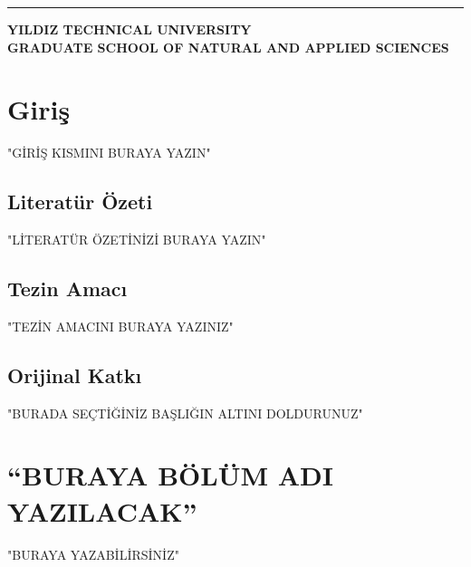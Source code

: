 \documentclass[12pt]{report}
\begin{document}
\vspace{1ex}
\hrule
\begin{flushright}
\textbf{YILDIZ TECHNICAL UNIVERSITY \\ GRADUATE SCHOOL OF NATURAL AND APPLIED SCIENCES}
\end{flushright}



{}

\chapter{Giriş} %
"GİRİŞ KISMINI BURAYA YAZIN"

\section{Literatür Özeti} %
\label{sec: literatur ozeti}
"LİTERATÜR ÖZETİNİZİ BURAYA YAZIN"

\section{Tezin Amacı} %
\label{sec: amaç}
"TEZİN AMACINI BURAYA YAZINIZ"

\section{Orijinal Katkı} %
\label{sec: original}
"BURADA SEÇTİĞİNİZ BAŞLIĞIN ALTINI DOLDURUNUZ"

\chapter{``BURAYA BÖLÜM ADI YAZILACAK''} %
"BURAYA YAZABİLİRSİNİZ"
\end{document}
